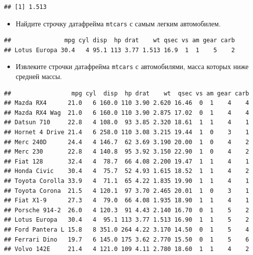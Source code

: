 \documentclass[]{book}
\newenvironment{Shaded}{\begin{snugshade}}{\end{snugshade}}
\newcommand{\KeywordTok}[1]{\textcolor[rgb]{0.13,0.29,0.53}{\textbf{#1}}}
\newcommand{\StringTok}[1]{\textcolor[rgb]{0.31,0.60,0.02}{#1}}
\newcommand{\OperatorTok}[1]{\textcolor[rgb]{0.81,0.36,0.00}{\textbf{#1}}}
\newcommand{\NormalTok}[1]{#1}
\providecommand{\tightlist}{%
  \setlength{\itemsep}{0pt}\setlength{\parskip}{0pt}}
\begin{document}
\begin{verbatim}
## [1] 1.513
\end{verbatim}

\begin{itemize}
\tightlist
\item
  Найдите строчку датафрейма \texttt{mtcars} с самым легким автомобилем.
\end{itemize}

\begin{Shaded}
\end{Shaded}

\begin{verbatim}
##               mpg cyl disp  hp drat    wt qsec vs am gear carb
## Lotus Europa 30.4   4 95.1 113 3.77 1.513 16.9  1  1    5    2
\end{verbatim}

\begin{itemize}
\tightlist
\item
  Извлеките строчки датафрейма \texttt{mtcars} с автомобилями, масса
  которых ниже средней массы.
\end{itemize}

\begin{Shaded}
\end{Shaded}

\begin{verbatim}
##                 mpg cyl  disp  hp drat    wt  qsec vs am gear carb
## Mazda RX4      21.0   6 160.0 110 3.90 2.620 16.46  0  1    4    4
## Mazda RX4 Wag  21.0   6 160.0 110 3.90 2.875 17.02  0  1    4    4
## Datsun 710     22.8   4 108.0  93 3.85 2.320 18.61  1  1    4    1
## Hornet 4 Drive 21.4   6 258.0 110 3.08 3.215 19.44  1  0    3    1
## Merc 240D      24.4   4 146.7  62 3.69 3.190 20.00  1  0    4    2
## Merc 230       22.8   4 140.8  95 3.92 3.150 22.90  1  0    4    2
## Fiat 128       32.4   4  78.7  66 4.08 2.200 19.47  1  1    4    1
## Honda Civic    30.4   4  75.7  52 4.93 1.615 18.52  1  1    4    2
## Toyota Corolla 33.9   4  71.1  65 4.22 1.835 19.90  1  1    4    1
## Toyota Corona  21.5   4 120.1  97 3.70 2.465 20.01  1  0    3    1
## Fiat X1-9      27.3   4  79.0  66 4.08 1.935 18.90  1  1    4    1
## Porsche 914-2  26.0   4 120.3  91 4.43 2.140 16.70  0  1    5    2
## Lotus Europa   30.4   4  95.1 113 3.77 1.513 16.90  1  1    5    2
## Ford Pantera L 15.8   8 351.0 264 4.22 3.170 14.50  0  1    5    4
## Ferrari Dino   19.7   6 145.0 175 3.62 2.770 15.50  0  1    5    6
## Volvo 142E     21.4   4 121.0 109 4.11 2.780 18.60  1  1    4    2
\end{verbatim}
\end{document}
